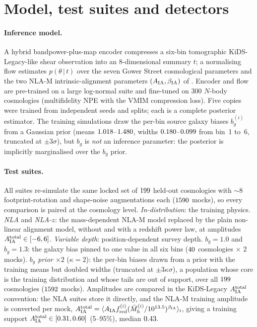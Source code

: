 \documentclass[9pt,twocolumn]{extarticle}
\newcommand{\Aia}{A_{\rm IA}^{\rm total}}
\newcommand{\bg}{b_g}
\begin{document}
\section{Model, test suites and detectors}
\paragraph{Inference model.} A hybrid bandpower-plus-map encoder compresses a six-bin tomographic
KiDS-Legacy-like shear observation into an 8-dimensional summary $t$; a normalising flow estimates
$p(\theta\,|\,t)$ over the seven Gower Street cosmological parameters and the two NLA-M
intrinsic-alignment parameters $(A_{\rm IA},\beta_{\rm IA})$ of \cite{wright2025}. Encoder and flow are
pre-trained on a large log-normal suite and fine-tuned on 300 $N$-body cosmologies (multifidelity NPE
with the VMIM compression loss). Five copies were trained from independent seeds and splits; each is a
complete posterior estimator. The training simulations draw the per-bin source galaxy biases
$\bg^{(i)}$ from a Gaussian prior (means $1.018$--$1.480$, widths
$0.180$--$0.099$ from bin~1 to~6, truncated at $\pm3\sigma$), but
$\bg$ is \emph{not} an inference parameter: the posterior is implicitly marginalised over the $\bg$ prior.

\paragraph{Test suites.} All suites re-simulate the same locked set of $199$ held-out
cosmologies with $\sim$8 footprint-rotation and shape-noise augmentations each ($1590$ mocks), so
every comparison is paired at the cosmology level. \emph{In-distribution}: the training physics.
\emph{NLA} and \emph{NLA-$z$}: the mass-dependent NLA-M model replaced by the plain non-linear
alignment model, without and with a redshift power law, at amplitudes $\Aia\in[-6,6]$.
\emph{Variable depth}: position-dependent survey depth. \emph{$\bg=1.0$} and \emph{$\bg=1.3$}: the
galaxy bias pinned to one value in all six bins ($40$ cosmologies $\times$ 2 mocks).
\emph{$\bg$ prior $\times2$} ($\kappa=2$): the per-bin biases drawn from a prior with the training
means but doubled widths (truncated at $\pm3\kappa\sigma$), a population whose core is the training
distribution and whose tails are out of support, over all $199$ cosmologies ($1592$ mocks).
Amplitudes are compared in the KiDS-Legacy $\Aia$ convention: the NLA suites store it directly, and
the NLA-M training amplitude is converted per mock,
$\Aia=\langle A_{\rm IA} f_{\rm red}^{(i)}(\bar M_h^{(i)}/10^{13.5})^{\beta_{\rm IA}}\rangle_i$, giving a
training support $\Aia\in[\NAiaBandLo,\NAiaBandHi]$ (5--95\%), median $0.43$.
\end{document}
